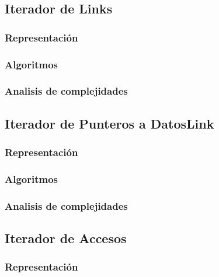 \documentclass[12pt, a4paper]{article}
\begin{document}
\subsection{Iterador de Links} 
%
\subsubsection{Representaci\'on}

\subsubsection{Algoritmos}

\subsubsection{Analisis de complejidades}

 
\subsection{Iterador de Punteros a DatosLink} 
%
\subsubsection{Representaci\'on}

\subsubsection{Algoritmos}

\subsubsection{Analisis de complejidades}

 
\subsection{Iterador de Accesos} 
%
\subsubsection{Representaci\'on}

\end{document}
